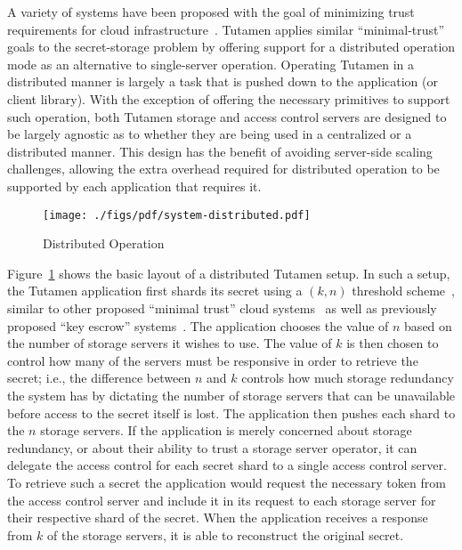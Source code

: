 A variety of systems have been proposed with the goal of minimizing
trust requirements for cloud infrastructure~\cite{bessani2011,
  kallahalla2003, kubiatowicz2000, mahajan2011,
  wilcox-o'hearn2008}. Tutamen applies similar ``minimal-trust'' goals
to the secret-storage problem by offering support for a distributed
operation mode as an alternative to single-server operation. Operating
Tutamen in a distributed manner is largely a task that is pushed down
to the application (or client library). With the exception of offering
the necessary primitives to support such operation, both Tutamen
storage and access control servers are designed to be largely agnostic
as to whether they are being used in a centralized or a distributed
manner. This design has the benefit of avoiding server-side scaling
challenges, allowing the extra overhead required for distributed
operation to be supported by each application that requires it.

\begin{figure}[th]
  \centering
  \texttt{[image: ./figs/pdf/system-distributed.pdf]}
  \caption{Distributed Operation}
  \label{fig:tutamen:systemdistributed}
\end{figure}

Figure~\ref{fig:tutamen:systemdistributed} shows the basic layout of a
distributed Tutamen setup. In such a setup, the Tutamen application
first shards its secret using a $(k, n)$ threshold
scheme~\cite{krawczyk1993, shamir1979}, similar to other proposed
``minimal trust'' cloud systems~\cite{bessani2011} as well as
previously proposed ``key escrow'' systems~\cite{blaze1996,
  denning1996}. The application chooses the value of $n$ based on the
number of storage servers it wishes to use. The value of $k$ is
then chosen to control how many of the servers must be responsive in
order to retrieve the secret; i.e., the difference between $n$ and
$k$ controls how much storage redundancy the system has by dictating
the number of storage servers that can be unavailable before access to
the secret itself is lost. The application then pushes each shard to
the $n$ storage servers. If the application is merely concerned about
storage redundancy, or about their ability to trust a storage server
operator, it can delegate the access control for each secret shard to
a single access control server. To retrieve such a secret the
application would request the necessary token from the access control
server and include it in its request to each storage server for their
respective shard of the secret. When the application receives a
response from $k$ of the storage servers, it is able to reconstruct
the original secret.

